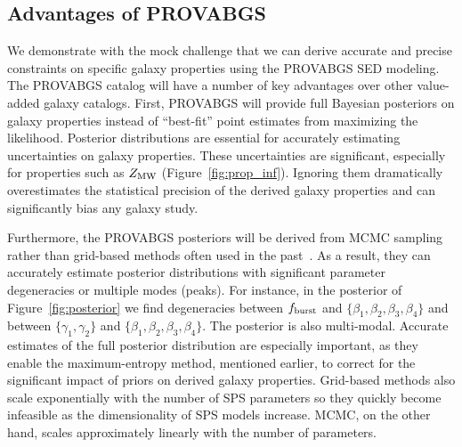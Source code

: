 \subsection{Advantages of PROVABGS}
We demonstrate with the mock challenge that we can derive accurate and precise
constraints on specific galaxy properties using the {\sc PROVABGS} SED modeling.
The {\sc PROVABGS} catalog will have a number of key advantages over other
value-added galaxy catalogs. 
First, {\sc PROVABGS} will provide full Bayesian posteriors on galaxy
properties instead of ``best-fit'' point estimates from maximizing the
likelihood. 
Posterior distributions are essential for accurately estimating uncertainties
on galaxy properties.  
These uncertainties are significant, especially for properties such as $Z_{\rm MW}$
(Figure~\ref{fig:prop_inf}). 
Ignoring them dramatically overestimates the statistical precision of the
derived galaxy properties and can significantly bias any galaxy study.

Furthermore, the {\sc PROVABGS} posteriors will be derived from MCMC sampling
rather than grid-based methods often used in the
past~\citep[\emph{e.g.}][]{dacunha2008, moustakas2013, boquien2019}.
As a result, they can accurately estimate posterior distributions with
significant parameter degeneracies or multiple modes (peaks). 
For instance, in the posterior of Figure~\ref{fig:posterior} we find
degeneracies between $f_{\rm burst}$ and $\{\beta_1, \beta_2, \beta_3,
\beta_4\}$ and between $\{\gamma_1, \gamma_2\}$ and $\{\beta_1, \beta_2,
\beta_3, \beta_4\}$. 
The posterior is also multi-modal. 
Accurate estimates of the full posterior distribution are especially important,
as they enable the maximum-entropy method, mentioned earlier, 
to correct for the significant impact of priors on derived galaxy properties.
Grid-based methods also scale exponentially with the number of SPS parameters
so they quickly become infeasible as the dimensionality of SPS models increase. 
MCMC, on the other hand, scales approximately linearly with the number of
parameters. 

